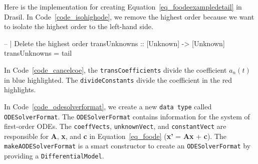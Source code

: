 
Here is the implementation for creating Equation~\ref{eq_foodeexampledetail} in Drasil. In Code~\ref{code_isohighode}, we remove the highest order because we want to isolate the highest order to the left-hand side.
\begin{listing}[ht]
\begin{haskell1}
-- | Delete the highest order
transUnknowns :: [Unknown] -> [Unknown]
transUnknowns = tail
\end{haskell1}
\label{code_isohighode}
\end{listing}

In Code~\ref{code_cancelcoe}, the \verb|transCoefficients| divide the coefficient $a_n(t)$ in blue highlighted. The \verb|divideConstants| divide the coefficient in the red highlights.
\begin{listing}[ht]
\label{code_cancelcoe}
\end{listing}

In Code~\ref{code_odesolverformat}, we create a new \verb|data type| called \verb|ODESolverFormat|. The \verb|ODESolverFormat| contains information for the system of first-order ODEs. The \verb|coeffVects|, \verb|unknownVect|, and \verb|constantVect| are responsible for \textbf{A}, \textbf{x}, and \textbf{c} in Equation~\ref{eq_foode} (\textbf{x'} = \textbf{Ax} + \textbf{c}). The \verb|makeAODESolverFormat| is a smart constructor to create an \verb|ODESolverFormat| by providing a \verb|DifferentialModel|.

